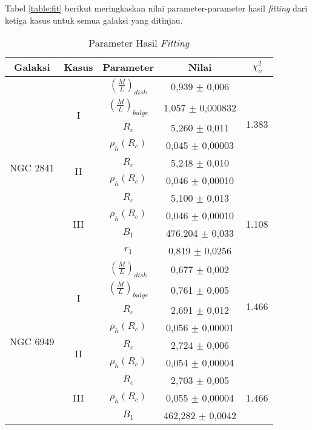 Tabel \ref{table:fit} berikut meringkaskan nilai parameter-parameter hasil \textit{fitting} dari ketiga kasus untuk semua galaksi yang ditinjau.\\
\begin{center}
\begin{longtable}[t]{ccccc}

\caption[Parameter Hasil \textit{Fitting} Kurva Rotasi]{Parameter Hasil \textit{Fitting}}\\

\hline
Galaksi & Kasus & Parameter & Nilai & $\chi_{\nu}^{2}$ \\
\hline
\endhead

\multirow{10}{*}{NGC 2841} & \multirow{4}{*}{I} & $(\frac{M}{L})_{disk}$ & 0,939 $\pm$ 0,006 & \multirow{5}{*}{1.383} &\\
& & $(\frac{M}{L})_{bulge}$ & 1,057 $\pm$ 0,000832 \\
& & $R_{c}$ & 5,260 $\pm$ 0,011 \\
& & $\rho_{h}(R_{c})$ & 0,045 $\pm$ 0,00003 \\ \cline{2-5}
\pagebreak
& \multirow{2}{*}{II} & $R_{c}$ & 5,248 $\pm$ 0,010 & \multirow{2}{*}{1.380} &\\
& & $\rho_{h}(R_{c})$ & 0,046 $\pm$ 0,00010 \\ \cline{2-5}
& \multirow{4}{*}{III} & $R_{c}$ & 5,100 $\pm$ 0,013 & \multirow{4}{*}{1.108} &\\
& & $\rho_{h}(R_{c})$ & 0,046 $\pm$ 0,00010 \\
& & $B_{1}$ & 476,204 $\pm$ 0,033 \\
& & $r_{1}$ & 0,819 $\pm$ 0,0256 \\ \hline
\multirow{10}{*}{NGC 6949} & \multirow{4}{*}{I} & $(\frac{M}{L})_{disk}$ & 0,677 $\pm$ 0,002 & \multirow{5}{*}{1.466} &\\
& & $(\frac{M}{L})_{bulge}$ & 0,761 $\pm$ 0,005 \\
& & $R_{c}$ & 2,691 $\pm$ 0,012 \\
& & $\rho_{h}(R_{c})$ & 0,056 $\pm$ 0,00001 \\ \cline{2-5}
& \multirow{2}{*}{II} & $R_{c}$ & 2,724 $\pm$ 0,006 & \multirow{2}{*}{3,408} &\\
& & $\rho_{h}(R_{c})$ & 0,054 $\pm$ 0,00004 \\ \cline{2-5}
& \multirow{4}{*}{III} & $R_{c}$ & 2,703 $\pm$ 0,005 & \multirow{4}{*}{1.466} &\\
& & $\rho_{h}(R_{c})$ & 0,055 $\pm$ 0,00004 \\
& & $B_{1}$ & 462,282 $\pm$ 0,0042 \\

\end{longtable}
\end{center}

